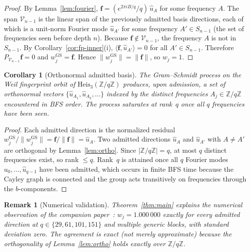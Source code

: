 \documentclass[11pt]{article}
\newtheorem{corollary}[theorem]{Corollary}
\newtheorem{remark}{Remark}
\newcommand{\Heis}{\mathrm{Heis}}
\newcommand{\fp}{\mathbf{f}}
\newcommand{\ue}{\hat{u}}
\begin{document}
    \begin{proof}
      By Lemma~\ref{lem:fourier}, $\fp=(e^{2\pi iB/q}/q)\,\ue_A$ for some frequency $A$.
      The span $\mathcal{V}_{n-1}$ is the linear span of the previously admitted basis
      directions, each of which is a unit-norm Fourier mode $\ue_{A'}$ for some frequency
      $A'\in S_{n-1}$ (the set of frequencies seen before depth $n$).
      Because $\fp\notin\mathcal{V}_{n-1}$, the frequency $A$ is not in $S_{n-1}$.
      By Corollary~\ref{cor:fp-inner}(i), $\langle\fp,\ue_{A'}\rangle=0$ for all
      $A'\in S_{n-1}$.
      Therefore $P_{\mathcal{V}_{n-1}}\fp = 0$ and $w^{\mathrm{GS}}_j = \fp$.
      Hence
      $\|w^{\mathrm{GS}}_j\| = \|\fp\|$, so $w_j = 1$.
    \end{proof}

    \begin{corollary}[Orthonormal admitted basis]
      \label{cor:ons}
      The Gram--Schmidt process on the Weil fingerprint orbit of
      $\Heis_3(\mathbb{Z}/q\mathbb{Z})$ produces, upon admission, a set of orthonormal
      vectors $\{\ue_{A_1},\ue_{A_2},\dots\}$ indexed by the distinct frequencies
      $A_j\in\mathbb{Z}/q\mathbb{Z}$ encountered in BFS order.
      The process saturates at rank~$q$ once all $q$ frequencies have been seen.
    \end{corollary}

    \begin{proof}
      Each admitted direction is the normalized residual $w^{\mathrm{GS}}_j/\|w^{\mathrm{GS}}_j\|
      = \fp/\|\fp\| = \ue_A$.
      Two admitted directions $\ue_A$ and $\ue_{A'}$ with $A\neq A'$ are orthogonal by
      Lemma~\ref{lem:ortho}.
      Since $|\mathbb{Z}/q\mathbb{Z}|=q$, at most $q$ distinct frequencies exist, so rank
      $\leq q$.
      Rank~$q$ is attained once all $q$ Fourier modes $\ue_0,\dots,\ue_{q-1}$ have been
      admitted, which occurs in finite BFS time because the Cayley graph is connected and
      the group acts transitively on frequencies through the $b$-components.
    \end{proof}

    \begin{remark}[Numerical validation]
Theorem~\ref{thm:main} explains the numerical observation of the companion
paper~\cite{Beau2026entnote}: $w_j=1.000\,000$ exactly for every admitted direction at
$q\in\{29,61,101,151\}$ and multiple generic blocks, with standard deviation zero.
The agreement is exact (not merely approximate) because the orthogonality
of Lemma~\ref{lem:ortho} holds exactly over $\mathbb{Z}/q\mathbb{Z}$.
    \end{remark}
\end{document}
